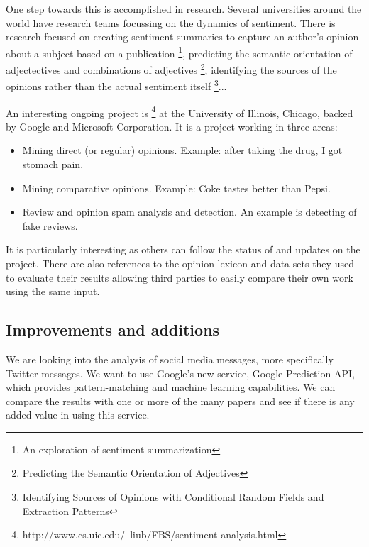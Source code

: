 One step towards this is accomplished in research. Several universities around the world have research teams focussing on the dynamics of sentiment. There is research focused on creating sentiment summaries to capture an author's opinion about a subject based on a publication \footnote{An exploration of sentiment summarization}, predicting the semantic orientation of adjectectives and combinations of adjectives \footnote{Predicting the Semantic Orientation of Adjectives}, identifying the sources of the opinions rather than the actual sentiment itself \footnote{Identifying Sources of Opinions with Conditional Random Fields and Extraction Patterns}...

An interesting ongoing project is \footnote{http://www.cs.uic.edu/~liub/FBS/sentiment-analysis.html} at the University of Illinois, Chicago, backed by Google and Microsoft Corporation. It is a project working in three areas: 

\begin{itemize}
	\item Mining direct (or regular) opinions. Example: after taking the drug, I got stomach pain.
	\item Mining comparative opinions. Example: Coke tastes better than Pepsi.
	\item Review and opinion spam analysis and detection. An example is detecting of fake reviews.
\end{itemize}

It is particularly interesting as others can follow the status of and updates on the project. There are also references to the opinion lexicon and data sets they used to evaluate their results allowing third parties to easily compare their own work using the same input.

\subsection{Improvements and additions}


We are looking into the analysis of social media messages, more specifically Twitter messages. We want to use Google's new service, Google Prediction API, which provides pattern-matching and machine learning capabilities. We can compare the results with one or more of the many papers and see if there is any added value in using this service.

